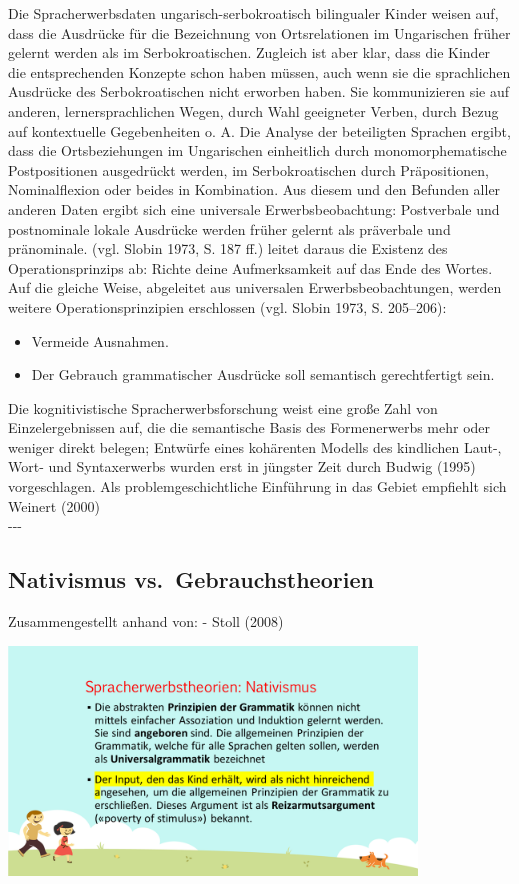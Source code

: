 \documentclass[
  letterpaper,
]{scrbook}
\begin{document}
Die Spracherwerbsdaten ungarisch-serbokroatisch bilingualer Kinder
weisen auf, dass die Ausdrücke für die Bezeichnung von Ortsrelationen im
Ungarischen früher gelernt werden als im Serbokroatischen. Zugleich ist
aber klar, dass die Kinder die entsprechenden Konzepte schon haben
müssen, auch wenn sie die sprachlichen Ausdrücke des Serbokroatischen
nicht erworben haben. Sie kommunizieren sie auf anderen,
lernersprachlichen Wegen, durch Wahl geeigneter Verben, durch Bezug auf
kontextuelle Gegebenheiten o. A. Die Analyse der beteiligten Sprachen
ergibt, dass die Ortsbeziehungen im Ungarischen einheitlich durch
monomorphematische Postpositionen ausgedrückt werden, im
Serbokroatischen durch Präpositionen, Nominalflexion oder beides in
Kombination. Aus diesem und den Befunden aller anderen Daten ergibt sich
eine universale Erwerbsbeobachtung: Postverbale und postnominale lokale
Ausdrücke werden früher gelernt als präverbale und pränominale. (vgl.
Slobin 1973, S. 187 ff.) leitet daraus die Existenz des
Operationsprinzips ab: Richte deine Aufmerksamkeit auf das Ende des
Wortes. Auf die gleiche Weise, abgeleitet aus universalen
Erwerbsbeobachtungen, werden weitere Operationsprinzipien erschlossen
(vgl. Slobin 1973, S. 205--206):

\begin{itemize}
\item
  Vermeide Ausnahmen.
\item
  Der Gebrauch grammatischer Ausdrücke soll semantisch gerechtfertigt
  sein.
\end{itemize}

Die kognitivistische Spracherwerbsforschung weist eine große Zahl von
Einzelergebnissen auf, die die semantische Basis des Formenerwerbs mehr
oder weniger direkt belegen; Entwürfe eines kohärenten Modells des
kindlichen Laut-, Wort- und Syntaxerwerbs wurden erst in jüngster Zeit
durch Budwig (1995) vorgeschlagen. Als problemgeschichtliche Einführung
in das Gebiet empfiehlt sich Weinert (2000)\\

-\/-\/-

\hypertarget{nativismus-vs.-gebrauchstheorien}{%
\subsection{Nativismus
vs.~Gebrauchstheorien}\label{nativismus-vs.-gebrauchstheorien}}

Zusammengestellt anhand von: - Stoll (2008)

\includegraphics[width=4.27in,height=\textheight]{./pictures/muster_intentionen/Diapozitiv2.PNG}
\end{document}
